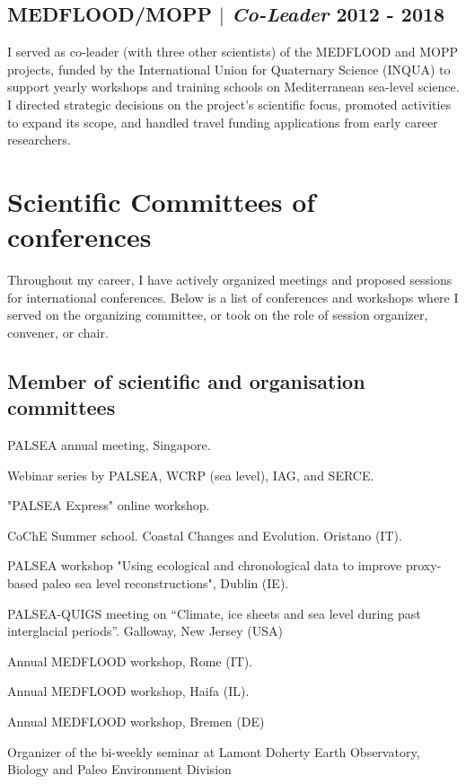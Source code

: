 \documentclass[11pt]{article}
\begin{document}
\subsection{MEDFLOOD/MOPP $|$ {\normalfont\textit{Co-Leader}} \hfill 2012 - 2018}
{\footnotesize I served as co-leader (with three other scientists) of the MEDFLOOD and MOPP projects, funded by the International Union for Quaternary Science (INQUA) to support yearly workshops and training schools on Mediterranean sea-level science. I directed strategic decisions on the project's scientific focus, promoted activities to expand its scope, and handled travel funding applications from early career researchers.}

\section{Scientific Committees of conferences}
{\normalfont Throughout my career, I have actively organized meetings and proposed sessions for international conferences. Below is a list of conferences and workshops where I served on the organizing committee, or took on the role of session organizer, convener, or chair.}\\

\bigskip
{\normalfont 
\subsection{Member of scientific and organisation committees}}
{\footnotesize
\begin{description}
  \item [2022] PALSEA annual meeting, Singapore.
  \item [2021] Webinar series by PALSEA, WCRP (sea level), IAG, and SERCE.
  \item [2020] "PALSEA Express" online workshop.
  \item [2019] CoChE Summer school. Coastal Changes and Evolution. Oristano (IT).
  \item [2019] PALSEA workshop "Using ecological and chronological data to improve proxy-based paleo sea level reconstructions", Dublin (IE).
  \item [2017] PALSEA-QUIGS meeting on “Climate, ice sheets and sea level during past interglacial periods”. Galloway, New Jersey (USA)
  \item [2012] Annual MEDFLOOD workshop, Rome (IT).
  \item [2014] Annual MEDFLOOD workshop, Haifa (IL).
  \item [2016] Annual MEDFLOOD workshop, Bremen (DE)
  \item [2013] Organizer of the bi-weekly seminar at Lamont Doherty Earth Observatory, Biology and Paleo Environment Division
  \item \end{description}}
\end{document}
